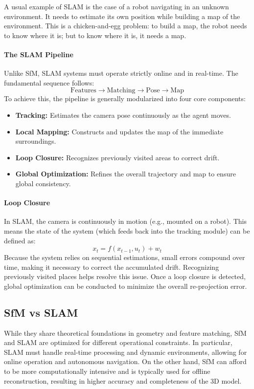 A usual example of SLAM is the case of a robot navigating in an unknown environment. It needs to estimate its own position while building a map of the environment.
This is a chicken-and-egg problem: to build a map, the robot needs to know where it is; but to know where it is, it needs a map.

\paragraph{The SLAM Pipeline}
Unlike SfM, SLAM systems must operate strictly online and in real-time. The fundamental sequence follows:
\[ \text{Features} \rightarrow \text{Matching} \rightarrow \text{Pose} \rightarrow \text{Map} \]
To achieve this, the pipeline is generally modularized into four core components:
\begin{itemize}
    \item \textbf{Tracking:} Estimates the camera pose continuously as the agent moves.
    \item \textbf{Local Mapping:} Constructs and updates the map of the immediate surroundings.
    \item \textbf{Loop Closure:} Recognizes previously visited areas to correct drift.
    \item \textbf{Global Optimization:} Refines the overall trajectory and map to ensure global consistency.
\end{itemize}

\paragraph{Loop Closure}
In SLAM, the camera is continuously in motion (e.g., mounted on a robot). This means the state of the system (which feeds back into the tracking module) can be defined as:
\[ x_t = f(x_{t-1}, u_t) + w_t \]
Because the system relies on sequential estimations, small errors compound over time, making it necessary to correct the accumulated drift. Recognizing previously visited places helps resolve this issue. Once a loop closure is detected, global optimization can be conducted to minimize the overall re-projection error.

\subsection{SfM vs SLAM}
While they share theoretical foundations in geometry and feature matching, SfM and SLAM are optimized for different operational constraints. 
In particular, SLAM must handle real-time processing and dynamic environments, allowing for online operation and autonomous navigation.
On the other hand, SfM can afford to be more computationally intensive and is typically used for offline reconstruction, resulting in higher accuracy and completeness of the 3D model. 
